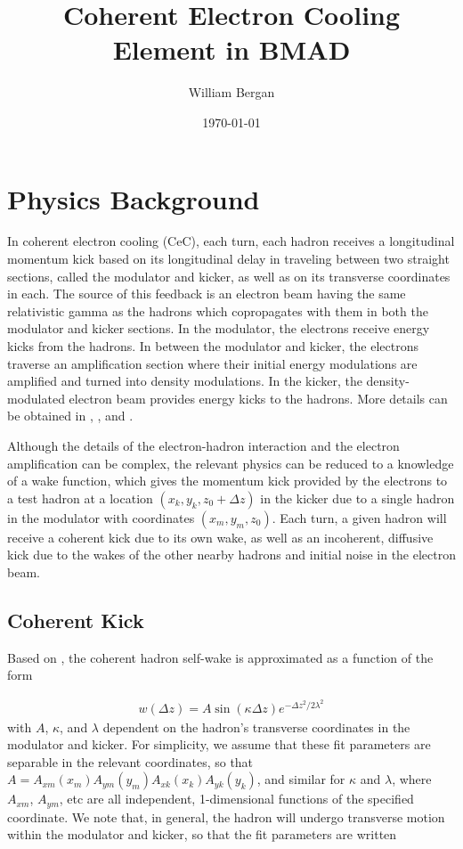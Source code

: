 \documentclass[letterpaper,11pt]{article}
\title{Coherent Electron Cooling Element in BMAD}
\author{William Bergan}
\date{\today}
\begin{document}
\maketitle



\section{Physics Background}

In coherent electron cooling (CeC), each turn, each hadron receives a longitudinal momentum kick based on its longitudinal delay in traveling between two straight sections, called the modulator and kicker, as well as on its transverse coordinates in each. The source of this feedback is an electron beam having the same relativistic gamma as the hadrons which copropagates with them in both the modulator and kicker sections. In the modulator, the electrons receive energy kicks from the hadrons. In between the modulator and kicker, the electrons traverse an amplification section where their initial energy modulations are amplified and turned into density modulations. In the kicker, the density-modulated electron beam provides energy kicks to the hadrons. More details can be obtained in \cite{cite:stupakovorig}, \cite{cite:stupakovamp}, and \cite{cite:stupakov3d}.

Although the details of the electron-hadron interaction and the electron amplification can be complex, the relevant physics can be reduced to a knowledge of a wake function, which gives the momentum kick provided by the electrons to a test hadron at a location $(x_k, y_k, z_0+\Delta z)$ in the kicker due to a single hadron in the modulator with coordinates $(x_m, y_m, z_0)$. Each turn, a given hadron will receive a coherent kick due to its own wake, as well as an incoherent, diffusive kick due to the wakes of the other nearby hadrons and initial noise in the electron beam.


\subsection{Coherent Kick}
Based on \cite{cite:nagaitsev}, the coherent hadron self-wake is approximated as a function of the form 

\begin{align}\label{eqtn:cec_wake_form}
	w(\Delta z) = A\sin(\kappa \Delta z)e^{-\Delta z^2/2\lambda^2}
\end{align}
\noindent
with $A$, $\kappa$, and $\lambda$ dependent on the hadron's transverse coordinates in the modulator and kicker. For simplicity, we assume that these fit parameters are separable in the relevant coordinates, so that $A = A_{xm}(x_m) A_{ym}(y_m) A_{xk}(x_k) A_{yk}(y_k)$, and similar for $\kappa$ and $\lambda$, where $A_{xm}$, $A_{ym}$, etc are all independent, 1-dimensional functions of the specified coordinate. We note that, in general, the hadron will undergo transverse motion within the modulator and kicker, so that the fit parameters are written
\end{document}

